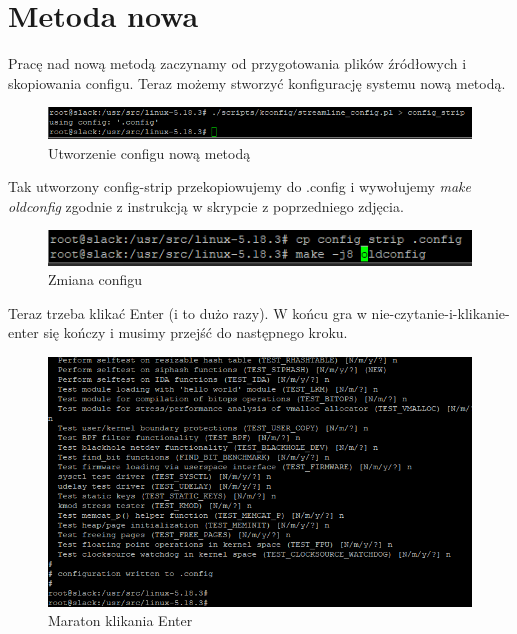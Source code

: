 \documentclass[a4paper,12pt,oneside]{book} %
\begin{document}
\chapter{Metoda nowa}
\label{Metoda nowa}

Pracę nad nową metodą zaczynamy od przygotowania plików źródłowych i skopiowania configu. Teraz możemy stworzyć konfigurację systemu nową metodą.

\begin{figure}[h]
	\centering
	\includegraphics[scale=0.6]{28-config}
	\caption{Utworzenie configu nową metodą}
\end{figure}

Tak utworzony config-strip przekopiowujemy do .config i wywołujemy \emph{make oldconfig} zgodnie z instrukcją w skrypcie z poprzedniego zdjęcia.

\begin{figure}[h]
	\centering
	\includegraphics[scale=0.6]{29-config}
	\caption{Zmiana configu}
\end{figure}

\pagebreak

Teraz trzeba klikać Enter (i to dużo razy). W końcu gra w nie-czytanie-i-klikanie-enter się kończy i musimy przejść do następnego kroku.

\begin{figure}[h]
	\centering
	\includegraphics[scale=0.6]{30-config}
	\caption{Maraton klikania Enter}
\end{figure}
\end{document}
